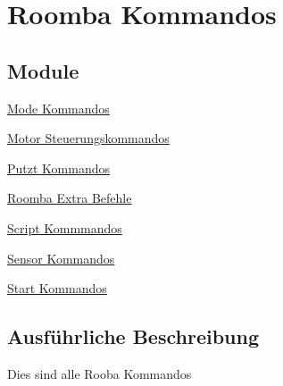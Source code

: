 \hypertarget{group__roomba__commands}{\section{Roomba Kommandos}
\label{group__roomba__commands}
}
\subsection*{Module}
\begin{DoxyCompactItemize}
\item 
\hyperlink{group__roomba__command__mode}{Mode Kommandos}
\item 
\hyperlink{group__roomba__commands__motor}{Motor Steuerungskommandos}
\item 
\hyperlink{group__roomba__commands__clean}{Putzt Kommandos}
\item 
\hyperlink{group__roomba__commands__extra}{Roomba Extra Befehle}
\item 
\hyperlink{group__roomba__commands__script}{Script Kommmandos}
\item 
\hyperlink{group__roomba__commands__sensor}{Sensor Kommandos}
\item 
\hyperlink{group__roomba__commands__start}{Start Kommandos}
\end{DoxyCompactItemize}


\subsection{Ausführliche Beschreibung}
Dies sind alle Rooba Kommandos 